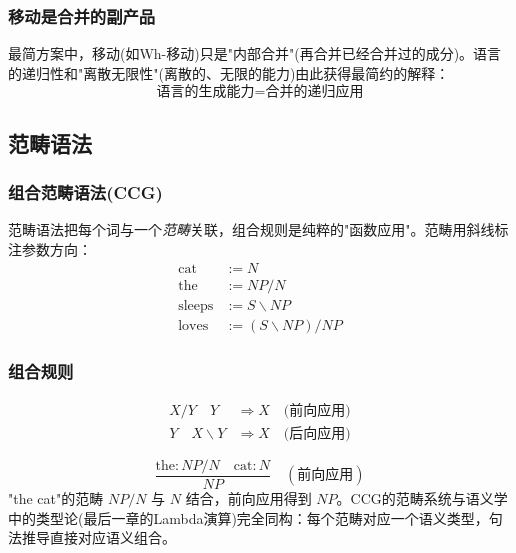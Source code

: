 \subsubsection{移动是合并的副产品}

最简方案中，移动(如Wh-移动)只是"内部合并"(再合并已经合并过的成分)。语言的递归性和"离散无限性"(离散的、无限的能力)由此获得最简约的解释：
\begin{equation}
    \text{语言的生成能力} = \text{合并的递归应用}
\end{equation}

\subsection{范畴语法}

\subsubsection{组合范畴语法(CCG)}

范畴语法把每个词与一个\emph{范畴}关联，组合规则是纯粹的"函数应用"。范畴用斜线标注参数方向：
\begin{equation}
    \begin{aligned}
    \text{cat} &:= N \\
    \text{the} &:= NP/N \\
    \text{sleeps} &:= S\backslash NP \\
    \text{loves} &:= (S\backslash NP)/NP
    \end{aligned}
\end{equation}

\subsubsection{组合规则}

\begin{equation}
    \begin{aligned}
    X/Y \quad Y &\Rightarrow X \quad \text{(前向应用)} \\
    Y \quad X\backslash Y &\Rightarrow X \quad \text{(后向应用)}
    \end{aligned}
\end{equation}

\begin{example}[CCG推导]
\begin{equation}
    \frac{\text{the} : NP/N \quad \text{cat}: N}{NP} \quad (\text{前向应用})
\end{equation}
"the cat"的范畴 $NP/N$ 与 $N$ 结合，前向应用得到 $NP$。CCG的范畴系统与语义学中的类型论(最后一章的Lambda演算)完全同构：每个范畴对应一个语义类型，句法推导直接对应语义组合。
\end{example}

